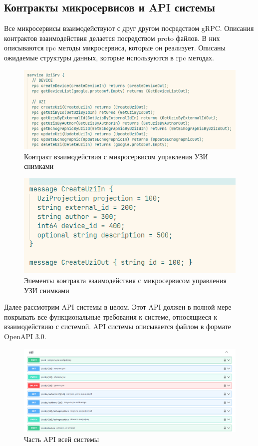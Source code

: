 \subsection{Контракты микросервисов и API системы}
Все микросервисы взаимодействуют с друг другом посредством gRPC. Описания контрактов взаимодействия делается посредством
proto файлов. В них описываются rpc методы микросервиса, которые он реализует. Описаны ожидаемые структуры данных, которые 
используются в rpc методах.

\begin{figure}[H]%
	\begin{center}
		\includegraphics[width=.7\columnwidth]{./img/new/rpc_proto_1.png}%
	\end{center}
	\caption{Контракт взаимодействия с микросервисом управления УЗИ снимками}%
	\label{pic:rpc_proto_1}%
\end{figure}

\begin{figure}[H]%
	\begin{center}
		\includegraphics[width=.7\columnwidth]{./img/new/rpc_proto_2.png}%
	\end{center}
	\caption{Элементы контракта взаимодействия с микросервисом управления УЗИ снимками}%
	\label{pic:rpc_proto_2}%
\end{figure}

Далее рассмотрим API системы в целом. Этот API должен в полной мере покрывать все функциональные требования к системе, 
относящиеся к взаимодействию с системой. API системы описывается файлом в формате OpenAPI 3.0.

\begin{figure}[H]%
	\begin{center}
		\includegraphics[width=.7\columnwidth]{./img/new/swagger_small.png}%
	\end{center}
	\caption{Часть API всей системы}%
	\label{pic:swagger_small}%
\end{figure}

